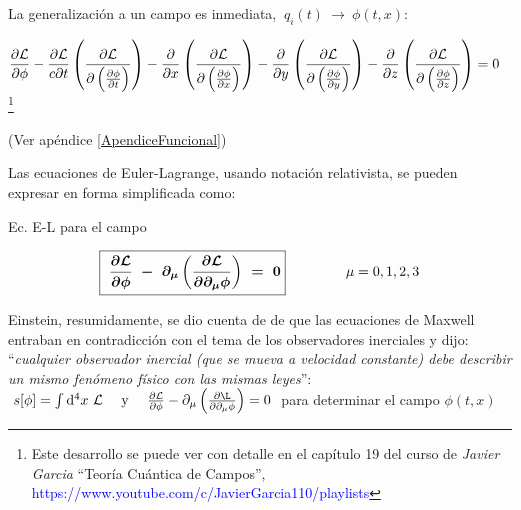 La generalización a un campo es inmediata, $\ q_i(t) \ \to \ \phi(t,x):$

$\displaystyle \pdv{\mathcal L}{\phi} - \dfrac{\partial \mathcal L}{c \partial t}  \left(\displaystyle \pdv{\mathcal L}{ \left( \pdv{\phi}{t} \right) } \right) - 
\pdv{x}  \left(\displaystyle \pdv{\mathcal L}{ \left( \pdv{\phi}{x} \right) } \right) 
- \pdv{y}  \left(\displaystyle \pdv{\mathcal L}{ \left( \pdv{\phi}{y} \right) } \right) 
- \pdv{z}  \left(\displaystyle \pdv{\mathcal L}{ \left( \pdv{\phi}{z} \right) } \right) 
=0\ \ $ \footnote{ Este desarrollo se puede ver con detalle en el capítulo 19 del curso de \emph{Javier Garcia} ``Teoría Cuántica de Campos'', \textcolor{blue}{https://www.youtube.com/c/JavierGarcia110/playlists}} \begin{small} (Ver apéndice \ref{ApendiceFuncional})\end{small}

Las ecuaciones de Euler-Lagrange, usando notación relativista, se pueden expresar en forma simplificada como:

\begin{myblock}{Ec. E-L para el campo}
\begin{large}
\begin{equation}
\label{T29E-L-Campo}
\boldsymbol{
\boxed{ \ 
\pdv{\mathcal L}{\phi} \ - \ \partial_\mu \left( \pdv{\mathcal L}{\partial_\mu \phi} \right) \ = \ 0
}	\ }  \qquad \qquad \mu=0,1,2,3
\end{equation}
\end{large}
\end{myblock}

\vspace{5mm}
Einstein, resumidamente, se dio cuenta de de que las ecuaciones de Maxwell entraban en contradicción con el tema de los observadores inerciales y dijo:  ``\emph{cualquier observador inercial (que se mueva a velocidad constante) debe describir un mismo fenómeno físico con las mismas leyes}'': 
$\ s[\phi]=\int \dd^4 x \ \mathcal L \quad \text{ y } \quad  \pdv{\mathcal L}{\phi}-\partial_\mu \left( \pdv{\L}{\partial_\mu \phi} \right) =0\ $ para determinar el campo $\phi(t,x)$


